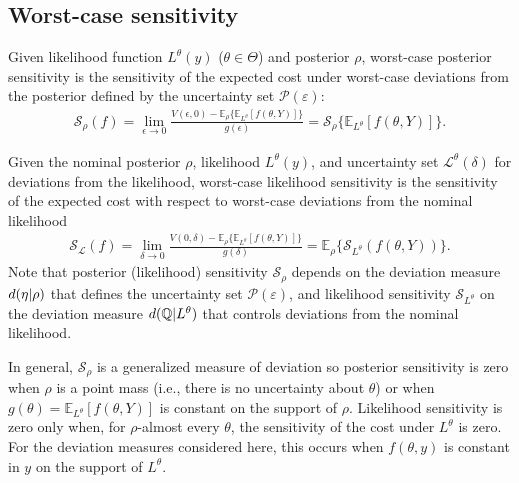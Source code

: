 \documentclass[10pt,a4paper]{amsart}
\numberwithin{equation}{section}
\numberwithin{theorem}{section}
\numberwithin{table}{section}
\numberwithin{figure}{section}
\begin{document}



\subsection{Worst-case sensitivity}

Given likelihood function $L^\theta(y)$ ($\theta\in\Theta$) and posterior $\rho$, 
worst-case posterior sensitivity is the sensitivity of the expected cost under worst-case deviations from the posterior defined by the uncertainty set ${\mathcal P}(\varepsilon)$:
\begin{eqnarray*}
{\mathcal S}_\rho(f)  =  \lim_{\epsilon\rightarrow 0}\frac{V(\epsilon, 0)- {\mathbb E}_\rho\Big\{{\mathbb E}_{L^\theta}[f(\theta, Y)]\Big\}}{g({\epsilon})}%
=
{\mathcal S}_\rho\Big\{{\mathbb E}_{L^\theta}[f(\theta, Y)]\Big\}.
\end{eqnarray*}

Given the nominal posterior $\rho$, likelihood  $L^\theta(y)$, and uncertainty set ${\mathcal L}^\theta(\delta)$ for deviations from the likelihood, worst-case likelihood sensitivity is the sensitivity of the expected cost with respect to worst-case deviations from the nominal likelihood
\begin{eqnarray*}
{\mathcal S}_{\mathcal L}(f)  =  \lim_{\delta\rightarrow 0}\frac{V(0, \delta)- {\mathbb E}_\rho\Big\{{\mathbb E}_{L^\theta}[f(\theta, Y)]\Big\}}{g(\delta)}%
 =  {\mathbb E}_\rho \Big\{{\mathcal S}_{L^\theta}(f(\theta, Y))\Big\}.
\end{eqnarray*}
Note that posterior (likelihood) sensitivity ${\mathcal S}_\rho$  depends on the deviation measure ${\rm d}(\eta|\rho)$  that defines the uncertainty set ${\mathcal P}(\varepsilon)$, and likelihood sensitivity  ${\mathcal S}_{L^\theta}$ on the deviation measure  ${\rm d}({\mathbb Q}|L^\theta)$ that controls deviations from the nominal likelihood. 





In general, ${\mathcal S}_\rho$ is a generalized measure of deviation \cite{gotoh2026sensitivity,rockafellar2006generalized} so posterior sensitivity is zero when $\rho$ is a point mass (i.e., there is no uncertainty about $\theta$) or when $g(\theta) = {\mathbb E}_{L^\theta}[f(\theta, Y)]$ is constant on the support of $\rho$. %
Likelihood sensitivity is zero only when, for $\rho$-almost every $\theta$, the sensitivity of the cost under $L^\theta$ is zero. For the deviation measures considered here, this occurs when $f(\theta, y)$ is constant in $y$ on the support of $L^\theta$.
\end{document}
